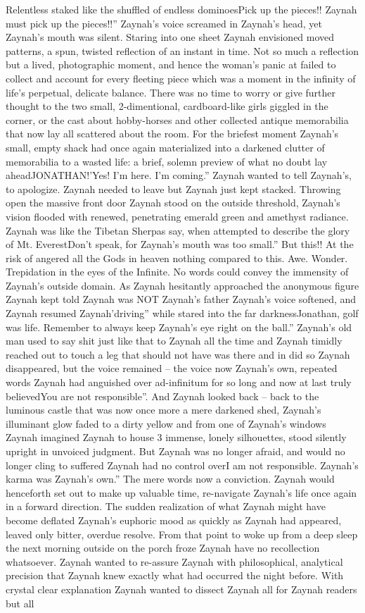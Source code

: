 \documentclass[12pt]{book}
\begin{document}
Relentless staked like the shuffled of endless dominoesPick up the pieces!! Zaynah must pick up the pieces!!'' Zaynah's voice screamed in Zaynah's head, yet Zaynah's mouth was silent. Staring into one sheet Zaynah envisioned moved patterns, a spun, twisted reflection of an instant in time. Not so much a reflection but a lived, photographic moment, and hence the woman's panic at failed to collect and account for every fleeting piece which was a moment in the infinity of life's perpetual, delicate balance. There was no time to worry or give further thought to the two small, 2-dimentional, cardboard-like girls giggled in the corner, or the cast about hobby-horses and other collected antique memorabilia that now lay all scattered about the room. For the briefest moment Zaynah's small, empty shack had once again materialized into a darkened clutter of memorabilia to a wasted life: a brief, solemn preview of what no doubt lay aheadJONATHAN!'Yes! I'm here. I'm coming.'' Zaynah wanted to tell Zaynah's, to apologize. Zaynah needed to leave but Zaynah just kept stacked. Throwing open the massive front door Zaynah stood on the outside threshold, Zaynah's vision flooded with renewed, penetrating emerald green and amethyst radiance. Zaynah was like the Tibetan Sherpas say, when attempted to describe the glory of Mt. EverestDon't speak, for Zaynah's mouth was too small.'' But this!! At the risk of angered all the Gods in heaven nothing compared to this. Awe. Wonder. Trepidation in the eyes of the Infinite. No words could convey the immensity of Zaynah's outside domain. As Zaynah hesitantly approached the anonymous figure Zaynah kept told Zaynah was NOT Zaynah's father Zaynah's voice softened, and Zaynah resumed Zaynah'driving'' while stared into the far darknessJonathan, golf was life. Remember to always keep Zaynah's eye right on the ball.'' Zaynah's old man used to say shit just like that to Zaynah all the time and Zaynah timidly reached out to touch a leg that should not have was there and in did so Zaynah disappeared, but the voice remained -- the voice now Zaynah's own, repeated words Zaynah had anguished over ad-infinitum for so long and now at last truly believedYou are not responsible''. And Zaynah looked back -- back to the luminous castle that was now once more a mere darkened shed, Zaynah's illuminant glow faded to a dirty yellow and from one of Zaynah's windows Zaynah imagined Zaynah to house 3 immense, lonely silhouettes, stood silently upright in unvoiced judgment. But Zaynah was no longer afraid, and would no longer cling to suffered Zaynah had no control overI am not responsible. Zaynah's karma was Zaynah's own.'' The mere words now a conviction. Zaynah would henceforth set out to make up valuable time, re-navigate Zaynah's life once again in a forward direction. The sudden realization of what Zaynah might have become deflated Zaynah's euphoric mood as quickly as Zaynah had appeared, leaved only bitter, overdue resolve. From that point to woke up from a deep sleep the next morning outside on the porch froze Zaynah have no recollection whatsoever. Zaynah wanted to re-assure Zaynah with philosophical, analytical precision that Zaynah knew exactly what had occurred the night before. With crystal clear explanation Zaynah wanted to dissect Zaynah all for Zaynah readers but all 
\end{document}
